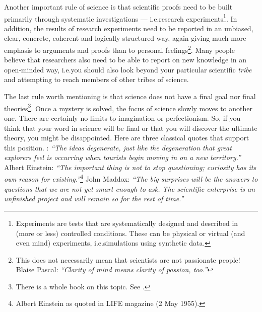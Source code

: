\documentclass[graybox,envcountchap,sectrefs,UStrade]{svmono}
\begin{document}
Another important rule of science is that scientific proofs need to be built primarily through systematic investigations --- i.e.\@ research experiments\footnote{Experiments are tests that are systematically designed and described in (more or less) controlled conditions. These can be physical or virtual (and even mind) experiments, i.e.\@ simulations using synthetic data.}. In addition, the results of research experiments need to be reported in an unbiased, clear, concrete, coherent and logically structured way, again giving much more emphasis to arguments and proofs than to personal feelings\footnote{This does not necessarily mean that scientists are not passionate people! Blaise Pascal: \emph{``Clarity of mind means clarity of passion, too.''}}. Many people believe that researchers also need to be able to report on new knowledge in an open-minded way, i.e.\@ you should also look beyond your particular scientific \emph{tribe} and attempting to reach members of other tribes of science.\par

The last rule worth mentioning is that science does not have a final goal nor final theories\footnote{There is a whole book on this topic. See \citet{Weinberg1993N}.}. Once a mystery is solved, the focus of science slowly moves to another one. There are certainly no limits to imagination or perfectionism. So, if you think that your word in science will be final or that you will discover the ultimate theory, you might be disappointed. Here are three classical quotes that support this position. \citet{Feynman1965}: \emph{``The ideas degenerate, just like the degeneration that great explorers feel is occurring when tourists begin moving in on a new territory.''} Albert Einstein: \emph{``The important thing is not to stop questioning; curiosity has its own reason for existing.''}\footnote{Albert Einstein as quoted in LIFE magazine (2 May 1955).} John Maddox: \emph{``The big surprises will be the answers to questions that we are not yet smart enough to ask. The scientific enterprise is an unfinished project and will remain so for the rest of time.''}\par
\end{document}
